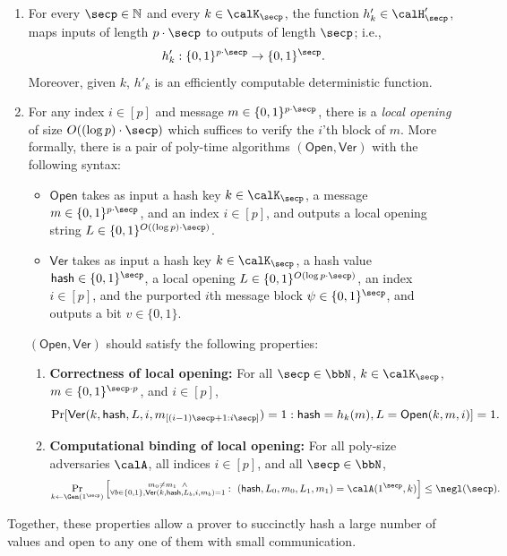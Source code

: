 \documentclass{article}
\newcommand{\Ver}{\mathsf{Ver}}
\newcommand{\Open}{\mathsf{Open}}
\newcommand{\hash}{\mathsf{hash}}
\begin{document}
\begin{enumerate}
    \item For every $\secp \in \mathbb{N}$ and every $k \in \calK_{\secp}$, the function $h'_k \in \calH'_{\secp}$, maps inputs of length $p \cdot \secp$ to outputs of length $\secp$; i.e.,
    \[
    h'_k:\{0,1\}^{p\cdot \secp}\rightarrow\{0,1\}^\secp.
    \]
    Moreover, given $k$, $h'_k$ is an efficiently computable deterministic function.
    \item For any index $i \in [p]$ and message $m \in \{0, 1\}^{p \cdot \secp}$, there is a {\it local opening} of size $O((\log p) \cdot \secp)$ which suffices to verify the $i$'th block of $m$. More formally, there is a pair of poly-time algorithms $(\Open, \Ver)$ with the following syntax:
    \begin{itemize}
        \item $\Open$ takes as input a hash key $k \in \calK_{\secp}$, a message $m \in \{0, 1\}^{p \cdot \secp}$, and an index $i \in [p]$, and outputs a local opening string $L \in \{0, 1\}^{O((\log p) \cdot \secp)}$.
        \item $\Ver$ takes as input a hash key $k \in \calK_{\secp}$, a hash value $\hash \in \{0, 1\}^{\secp}$, a local opening $L \in \{0, 1\}^{O(\log p \cdot \secp)}$, an index $i \in [p]$, and the purported $i$th message block $\psi \in \{0, 1\}^{\secp}$, and outputs a bit $v \in \{0, 1\}$.
    \end{itemize}
    $(\Open, \Ver)$ should satisfy the following properties:
    \begin{enumerate}
        \item \textbf{Correctness of local opening:} For all $\secp \in \bbN$,  $k \in \calK_{\secp}$, $m \in \{0, 1\}^{\secp \cdot p}$, and $i \in [p]$, 
        \[ \Pr[\Ver(k,\hash, L, i, m_{[(i-1)\secp+1:i\secp]}) = 1: \hash =h_k(m), L = \Open(k,m, i)] = 1. \]
        \item \textbf{Computational binding of local opening:} For all poly-size adversaries $\calA$, all indices $i \in [p]$, and all $\secp \in \bbN$,
            \[ \Pr_{k \gets \Gen(1^\secp)}\left[\substack{m_0 \neq m_1 \hspace{5pt} \land \\ \forall b \in \{0, 1\}, \Ver(k, \hash, L_b, i, m_b) = 1}:~(\hash, L_0, m_0, L_1, m_1) = \calA(1^\secp, k)\right] \leq \negl(\secp). \]
    \end{enumerate}
\end{enumerate}
Together, these properties allow a prover to succinctly hash a large number of values and open to any one of them with small communication.
\end{document}
